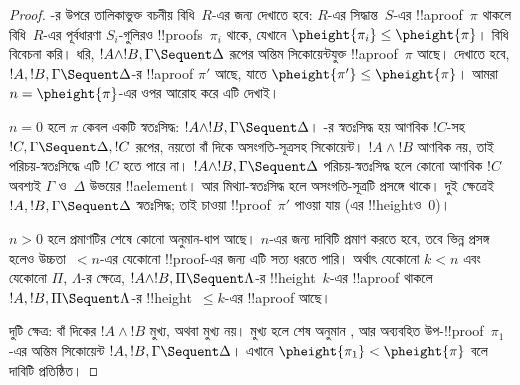 \documentclass[../../../include/open-logic-section]{subfiles}
\begin{document}
\begin{proof}
-র উপরে তালিকাভুক্ত বচনীয় বিধি~$R$-এর
জন্য দেখাতে হবে: $R$-এর সিদ্ধান্ত~$S$-এর
!!a{proof}~$\pi$ থাকলে বিধি~$R$-এর পূর্বধারণা
$S_i$-গুলিরও !!{proof}s~$\pi_i$
থাকে, যেখানে $\pheight{\pi_i}
\le \pheight{\pi}$। \LeftR{\land}
বিধি বিবেচনা করি। ধরি,
$!A \land !B, \Gamma
\Sequent \Delta$ রূপের অন্তিম
সিকোয়েন্টযুক্ত !!a{proof}~$\pi$
আছে। দেখাতে হবে,
$!A, !B, \Gamma \Sequent \Delta$-র
!!a{proof} $\pi'$ আছে, যাতে
$\pheight{\pi'} \le
\pheight{\pi}$। আমরা
$n = \pheight{\pi}$-এর ওপর
আরোহ করে এটি দেখাই।

$n = 0$ হলে $\pi$ কেবল একটি
স্বতঃসিদ্ধ: $!A \land !B, \Gamma
\Sequent \Delta$। -র
স্বতঃসিদ্ধ হয় আণবিক $!C$-সহ
$!C, \Gamma
\Sequent \Delta, !C$ রূপের,
নয়তো বাঁ দিকে অসংগতি-সূত্রসহ
সিকোয়েন্ট। $!A \land !B$
আণবিক নয়, তাই পরিচয়-স্বতঃসিদ্ধে
এটি $!C$ হতে পারে না।
$!A \land !B, \Gamma \Sequent
\Delta$ পরিচয়-স্বতঃসিদ্ধ হলে
কোনো আণবিক $!C$ অবশ্যই
$\Gamma$ ও~$\Delta$ উভয়ের
!!a{element}। আর মিথ্যা-স্বতঃসিদ্ধ
হলে অসংগতি-সূত্রটি প্রসঙ্গে থাকে।
দুই ক্ষেত্রেই $!A, !B, \Gamma
\Sequent \Delta$ স্বতঃসিদ্ধ;
তাই চাওয়া !!{proof}~$\pi'$
পাওয়া যায় (এর
!!{height}ও~$0$)।

$n>0$ হলে প্রমাণটির শেষে
কোনো অনুমান-ধাপ আছে।
$n$-এর জন্য দাবিটি প্রমাণ করতে হবে,
তবে ভিন্ন প্রসঙ্গ হলেও
উচ্চতা~$<n$-এর যেকোনো
!!{proof}-এর জন্য এটি সত্য
ধরতে পারি। অর্থাৎ যেকোনো
$k<n$ এবং যেকোনো
$\Pi$, $\Lambda$-র ক্ষেত্রে,
$!A \land !B, \Pi \Sequent
\Lambda$-র !!{height}~$k$-এর
!!a{proof} থাকলে
$!A, !B, \Pi \Sequent \Lambda$-র
!!{height}~$\le k$-এর
!!a{proof} আছে।

দুটি ক্ষেত্র: বাঁ দিকের
$!A \land !B$ মুখ্য,
অথবা মুখ্য নয়। মুখ্য হলে
শেষ অনুমান \LeftR{\land},
আর অব্যবহিত
উপ-!!{proof}~$\pi_1$-এর
অন্তিম সিকোয়েন্ট
$!A, !B, \Gamma \Sequent
\Delta$। এখানে
$\pheight{\pi_1} <
\pheight{\pi}$ বলে
দাবিটি প্রতিষ্ঠিত।


\end{proof}
\end{document}
